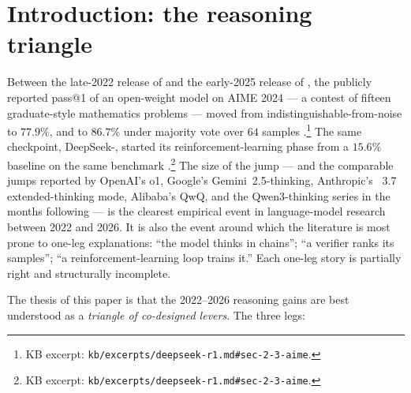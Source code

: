 
\section{Introduction: the reasoning triangle}
\label{sec:introduction}

Between the late-2022 release of \citet{wei2022-cot} and the early-2025
release of \citet{deepseek-r1}, the publicly reported pass@1 of an
open-weight model on AIME 2024 --- a contest of fifteen graduate-style
mathematics problems --- moved from indistinguishable-from-noise to
$77.9\%$, and to $86.7\%$ under majority vote over $64$ samples
\citep[\S 2.3]{deepseek-r1}.\footnote{KB excerpt:
\texttt{kb/excerpts/deepseek-r1.md\#sec-2-3-aime}.} The same checkpoint,
DeepSeek-, started its reinforcement-learning phase from a
$15.6\%$ baseline on the same benchmark
\citep[\S 2.3]{deepseek-r1}.\footnote{KB excerpt:
\texttt{kb/excerpts/deepseek-r1.md\#sec-2-3-aime}.} The size of the
jump --- and the comparable jumps reported by OpenAI's o1, Google's
Gemini~2.5-thinking, Anthropic's ~3.7 extended-thinking mode,
Alibaba's QwQ, and the Qwen3-thinking series in the months following
--- is the clearest empirical event in language-model research between
2022 and 2026. It is also the event around which the literature is
most prone to one-leg explanations: ``the model thinks in chains''; ``a
verifier ranks its samples''; ``a reinforcement-learning loop trains
it.'' Each one-leg story is partially right and structurally
incomplete.

The thesis of this paper is that the 2022--2026 reasoning gains are
best understood as a \emph{triangle of co-designed levers}. The three
legs:

